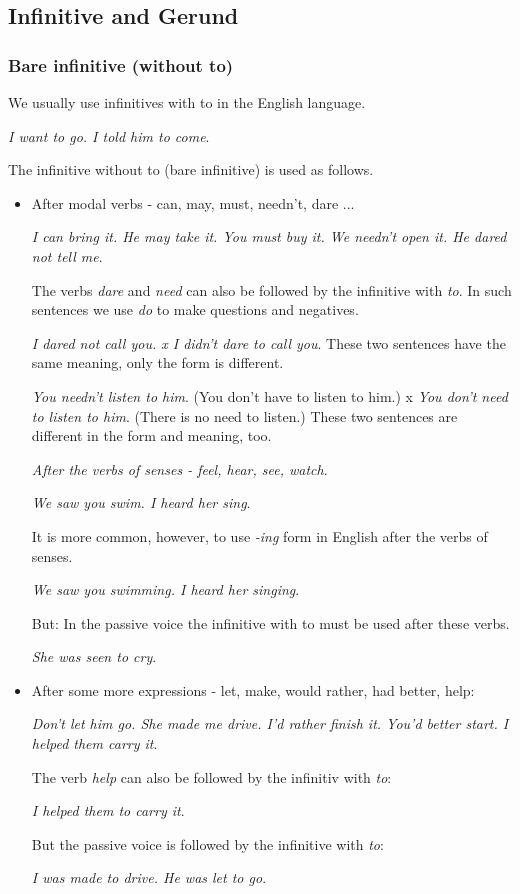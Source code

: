 \subsection{Infinitive and Gerund}

\subsubsection{Bare infinitive (without to)}

We usually use infinitives with to in the English language.

\textit{I want to go. I told him to come}.

The infinitive without to (bare infinitive) is used as follows.

\begin{itemize}

\item After modal verbs - can, may, must, needn't, dare ...

\textit{I can bring it. He may take it. You must buy it. We needn't open it. He dared not tell me}.

The verbs \textit{dare} and \textit{need} can also be followed by the infinitive with \textit{to}. In such sentences we use \textit{do} to make questions and negatives.

\textit{I dared not call you. x  I didn't dare to call you}. These two sentences have the same meaning, only the form is different.

\textit{You needn't listen to him}. (You don't have to listen to him.) x \textit{You don't need to listen to him}. (There is no need to listen.) These two sentences are different in the form and meaning, too.

\textit{After the verbs of senses - feel, hear, see, watch}.

\textit{We saw you swim. I heard her sing}.

It is more common, however, to use \textit{-ing} form in English after the verbs of senses.

\textit{We saw you swimming. I heard her singing}.

But: In the passive voice the infinitive with to must be used after these verbs.

\textit{She was seen to cry}.

\item After some more expressions - let, make, would rather, had better, help:

\textit{Don't let him go. She made me drive. I'd rather finish it. You'd better start. I helped them carry it}. 

The verb \textit{help} can also be followed by the infinitiv with \textit{to}:

\textit{I helped them to carry it}. 

But the passive voice is followed by the infinitive with \textit{to}:

\textit{I was made to drive. He was let to go}.

\end{itemize} 

